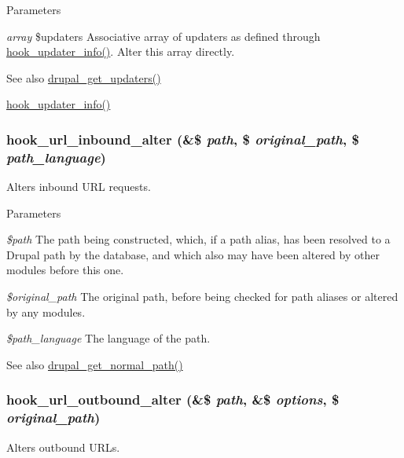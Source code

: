 \begin{DoxyParams}{Parameters}
\item[{\em array}]\$updaters Associative array of updaters as defined through \hyperlink{group__hooks_gafb9b375716a0ad02d35250dc252b3c99}{hook\_\-updater\_\-info()}. Alter this array directly.\end{DoxyParams}
\begin{DoxySeeAlso}{See also}
\hyperlink{common_8inc_a0fa53aa7b4cdefaccb5283da37ad75df}{drupal\_\-get\_\-updaters()} 

\hyperlink{group__hooks_gafb9b375716a0ad02d35250dc252b3c99}{hook\_\-updater\_\-info()} 
\end{DoxySeeAlso}
\hypertarget{group__hooks_ga32da9c3f1486c293818f30fa4037e33f}{
\subsubsection[{hook\_\-url\_\-inbound\_\-alter}]{\setlength{\rightskip}{0pt plus 5cm}hook\_\-url\_\-inbound\_\-alter (\&\$ {\em path}, \/  \$ {\em original\_\-path}, \/  \$ {\em path\_\-language})}}
\label{group__hooks_ga32da9c3f1486c293818f30fa4037e33f}
Alters inbound URL requests.


\begin{DoxyParams}{Parameters}
\item[{\em \$path}]The path being constructed, which, if a path alias, has been resolved to a Drupal path by the database, and which also may have been altered by other modules before this one. \item[{\em \$original\_\-path}]The original path, before being checked for path aliases or altered by any modules. \item[{\em \$path\_\-language}]The language of the path.\end{DoxyParams}
\begin{DoxySeeAlso}{See also}
\hyperlink{path_8inc_a59781811cbcdef4c64ccd1d55e1ae9f8}{drupal\_\-get\_\-normal\_\-path()} 
\end{DoxySeeAlso}
\hypertarget{group__hooks_gaae456dc4459a029bc099079814ded61f}{
\subsubsection[{hook\_\-url\_\-outbound\_\-alter}]{\setlength{\rightskip}{0pt plus 5cm}hook\_\-url\_\-outbound\_\-alter (\&\$ {\em path}, \/  \&\$ {\em options}, \/  \$ {\em original\_\-path})}}
\label{group__hooks_gaae456dc4459a029bc099079814ded61f}
Alters outbound URLs.


